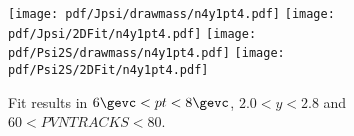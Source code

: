 \begin{figure}[H]
\begin{center}
\texttt{[image: pdf/Jpsi/drawmass/n4y1pt4.pdf]}
\texttt{[image: pdf/Jpsi/2DFit/n4y1pt4.pdf]}
\vspace*{-0.5cm}
\texttt{[image: pdf/Psi2S/drawmass/n4y1pt4.pdf]}
\texttt{[image: pdf/Psi2S/2DFit/n4y1pt4.pdf]}
\vspace*{-0.5cm}
\end{center}
\caption{Fit results in $6\gevc<pt<8\gevc$, $2.0<y<2.8$ and $60<PVNTRACKS<80$.}
\label{Fitn4y1pt4}
\end{figure}
